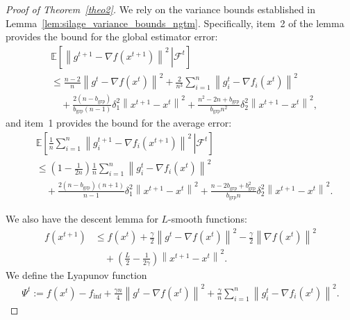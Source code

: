 \documentclass{article}
\newcommand{\sqn}[1]{\left\| #1 \right\|^2}
\newcommand{\finf}{f_\mathrm{inf}}
\newcommand{\eqdef}{:=}
\newcommand{\Expb}[2]{\mathbb{E}\!\left[\left. #1\,\right|#2 \right]}
\newcommand{\Expc}[1]{\Expb{#1}{\mathcal{F}^t}}
\newcommand {\rbl}[1]{(#1)} %
\newcommand{\nfi}[1]{\nabla f_i\rbl{#1}}
\theoremstyle{plain}
\begin{document}
\begin{proof}[Proof of Theorem~\ref{theo2}]
We rely on the variance bounds established in Lemma~\ref{lem:silage_variance_bounds_ngtm}.
Specifically, item~2 of the lemma provides the bound for the global estimator error:
\begin{align*}
&\Expc{\sqn{g^{t+1}-\nabla f(x^{t+1})}}\\
&\leq\frac{n-2}{n}\sqn{g^t-\nabla f(x^{t})}
+\frac{2}{n^3}\sum_{i=1}^n \sqn{g_i^t-\nabla f_i(x^{t})}\\
&\quad+\frac{2(n-b_{\mathrm{grp}})}{b_{\mathrm{grp}}(n-1)}\delta_1^2\sqn{x^{t+1}-x^t}
+\frac{n^2-2n+b_{\mathrm{grp}}}{b_{\mathrm{grp}}n^2}\delta_2^2\sqn{x^{t+1}-x^t},
\end{align*}
and item~1 provides the bound for the average error:
\begin{align*}
&\Expc{\frac1n\sum_{i=1}^n \sqn{g_i^{t+1}-\nfi{x^{t+1}}}}\\
&\leq\left(1-\frac{1}{2n}\right)\frac1n\sum_{i=1}^n \sqn{g_i^t-\nfi{x^{t}}}\\
&\quad+\frac{2(n-b_{\mathrm{grp}})(n+1)}{n-1}\delta_1^2\sqn{x^{t+1}-x^t}
+\frac{n-2b_{\mathrm{grp}}+b_{\mathrm{grp}}^2}{b_{\mathrm{grp}}n}\delta_2^2\sqn{x^{t+1}-x^t}.
\end{align*}

We also have the descent lemma for $L$-smooth functions:
\begin{align*}
f(x^{t+1})
&\leq f(x^t)
+\frac{\gamma}{2}\sqn{g^{t}-\nabla f(x^t)}
-\frac{\gamma}{2}\sqn{\nabla f(x^t)}\\
&\quad+\left(\frac{L}{2}-\frac{1}{2\gamma}\right)\sqn{x^{t+1}-x^t}.
\end{align*}
We define the Lyapunov function
\begin{align*}
\Psi^t\eqdef f(x^t)-\finf + \frac{\gamma n}{4}\sqn{g^{t}-\nabla f(x^t)}+\frac{\gamma}{n}\sum_{i=1}^n\sqn{g_i^t-\nabla f_{i}(x^{t})}.
\end{align*}


\end{proof}
\end{document}
